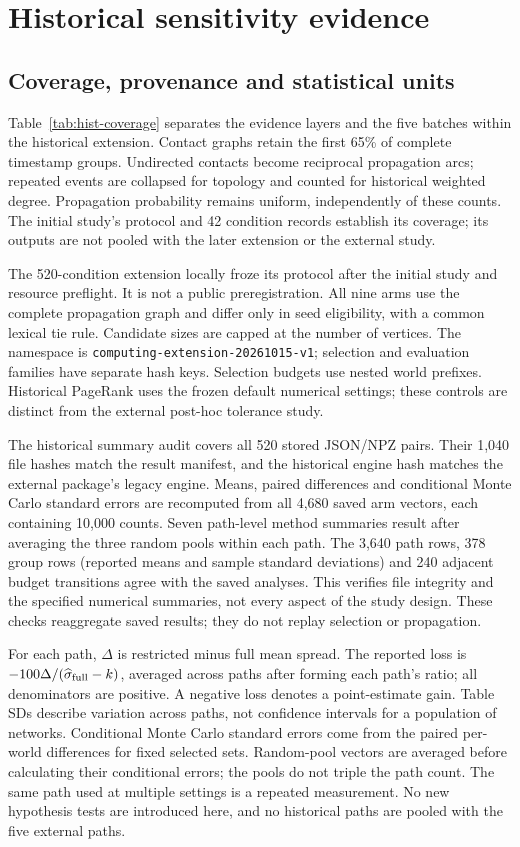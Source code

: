 \section{Historical sensitivity evidence}\label{sec:historical-evidence}
\subsection{Coverage, provenance and statistical units}
Table~\ref{tab:hist-coverage} separates the evidence layers and the five batches
within the historical extension. Contact graphs retain the first 65\% of complete
timestamp groups. Undirected contacts become reciprocal propagation arcs;
repeated events are collapsed for topology and counted for historical weighted
degree. Propagation probability remains uniform, independently of these counts.
The initial study's protocol and 42 condition records establish its coverage;
its outputs are not pooled with the later extension or the external study.


The 520-condition extension locally froze its protocol after the initial study
and resource preflight. It is not a public preregistration. All nine arms use
the complete propagation graph and differ only in seed eligibility, with a
common lexical tie rule. Candidate sizes are capped at the number of vertices.
The namespace is \texttt{computing-extension-20261015-v1}; selection and evaluation
families have separate hash keys. Selection budgets use nested world prefixes.
Historical PageRank uses the frozen default numerical settings; these controls
are distinct from the external post-hoc tolerance study.

The historical summary audit covers all 520 stored JSON/NPZ pairs. Their 1,040 file
hashes match the result manifest, and the historical engine hash matches the
external package's legacy engine. Means, paired differences and conditional
Monte Carlo standard errors are recomputed from all 4,680 saved arm vectors,
each containing 10,000 counts. Seven path-level method summaries result after
averaging the three random pools within each path. The 3,640 path rows,
378 group rows (reported means and sample standard deviations) and 240 adjacent
budget transitions agree with the saved analyses. This verifies file integrity
and the specified numerical summaries, not every aspect of the study design.
These checks reaggregate saved results; they do not replay selection or propagation.

For each path, $\Delta$ is restricted minus full mean spread. The reported loss
is $-100\Delta/(\widehat\sigma_{\rm full}-k)$, averaged across paths after forming
each path's ratio; all denominators are positive. A negative loss denotes a
point-estimate gain. Table SDs describe variation across paths, not confidence
intervals for a population of networks. Conditional Monte Carlo standard errors
come from the paired per-world differences for fixed selected sets. Random-pool
vectors are averaged before calculating their conditional errors; the pools do
not triple the path count. The same path used at multiple settings is a repeated
measurement. No new hypothesis tests are introduced here, and no historical
paths are pooled with the five external paths.

